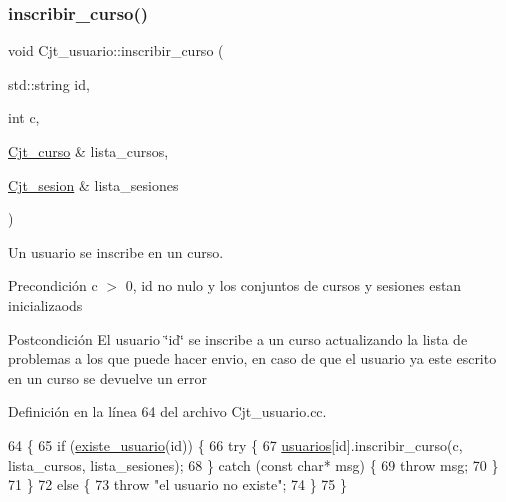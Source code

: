 \subsubsection{\texorpdfstring{inscribir\+\_\+curso()}{inscribir\_curso()}}
{\footnotesize\ttfamily void Cjt\+\_\+usuario\+::inscribir\+\_\+curso (\begin{DoxyParamCaption}\item[{std\+::string}]{id,  }\item[{int}]{c,  }\item[{\mbox{\hyperlink{class_cjt__curso}{Cjt\+\_\+curso}} \&}]{lista\+\_\+cursos,  }\item[{\mbox{\hyperlink{class_cjt__sesion}{Cjt\+\_\+sesion}} \&}]{lista\+\_\+sesiones }\end{DoxyParamCaption})}



Un usuario se inscribe en un curso. 

\begin{DoxyPrecond}{Precondición}
c $>$ 0, id no nulo y los conjuntos de cursos y sesiones estan inicializaods 
\end{DoxyPrecond}
\begin{DoxyPostcond}{Postcondición}
El usuario \char`\"{}id\char`\"{} se inscribe a un curso actualizando la lista de problemas a los que puede hacer envio, en caso de que el usuario ya este escrito en un curso se devuelve un error 
\end{DoxyPostcond}


Definición en la línea 64 del archivo Cjt\+\_\+usuario.\+cc.


\begin{DoxyCode}
64                                                                                                        \{
65   \textcolor{keywordflow}{if} (\mbox{\hyperlink{class_cjt__usuario_a2d4478e6b967659040f5a0b86b665204}{existe\_usuario}}(\textcolor{keywordtype}{id})) \{
66     \textcolor{keywordflow}{try} \{
67       \mbox{\hyperlink{class_cjt__usuario_af814d06f1c52bc2e744d253d20ce6e6b}{usuarios}}[id].inscribir\_curso(c, lista\_cursos, lista\_sesiones);
68     \} \textcolor{keywordflow}{catch} (\textcolor{keyword}{const} \textcolor{keywordtype}{char}* msg) \{
69       \textcolor{keywordflow}{throw} msg;
70     \}
71   \}
72   \textcolor{keywordflow}{else} \{
73     \textcolor{keywordflow}{throw} \textcolor{stringliteral}{"el usuario no existe"};
74   \}
75 \}
\end{DoxyCode}
\mbox{\label{class_cjt__usuario_a239dce70ba54f8a8f41fd180b703b7c9}} 
